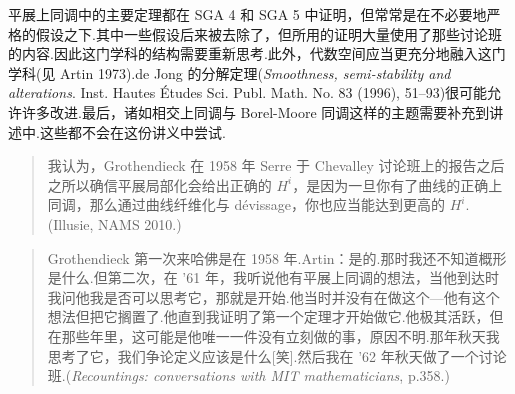 平展上同调中的主要定理都在 SGA 4 和 SGA 5 中证明，但常常是在不必要地严格的假设之下.其中一些假设后来被去除了，但所用的证明大量使用了那些讨论班的内容.因此这门学科的结构需要重新思考.此外，代数空间应当更充分地融入这门学科(见 Artin 1973).de Jong 的分解定理(\emph{Smoothness, semi-stability and alterations}. Inst. Hautes \'Etudes Sci. Publ. Math. No. 83 (1996), 51--93)很可能允许许多改进.最后，诸如相交上同调与 Borel-Moore 同调这样的主题需要补充到讲述中.这些都不会在这份讲义中尝试.

\begin{quote}
  我认为，Grothendieck 在 1958 年 Serre 于 Chevalley 讨论班上的报告之后之所以确信平展局部化会给出正确的 $H^i$，是因为一旦你有了曲线的正确上同调，那么通过曲线纤维化与 d\'evissage，你也应当能达到更高的 $H^i$.(Illusie, NAMS 2010.)
\end{quote}

\begin{quote}
  Grothendieck 第一次来哈佛是在 1958 年.Artin：是的.那时我还不知道概形是什么.但第二次，在 '61 年，我听说他有平展上同调的想法，当他到达时我问他我是否可以思考它，那就是开始.他当时并没有在做这个---他有这个想法但把它搁置了.他直到我证明了第一个定理才开始做它.他极其活跃，但在那些年里，这可能是他唯一一件没有立刻做的事，原因不明.那年秋天我思考了它，我们争论定义应该是什么[笑].然后我在 '62 年秋天做了一个讨论班.(\emph{Recountings: conversations with MIT mathematicians}, p.358.)
\end{quote}
